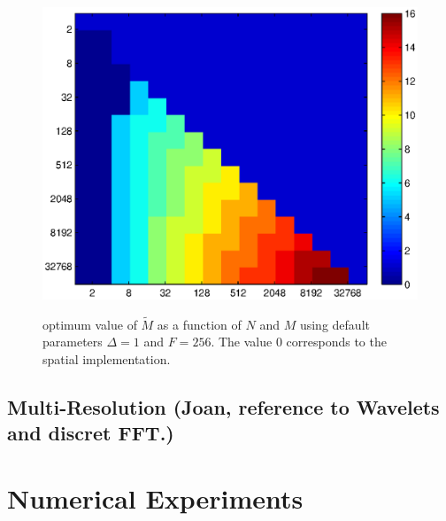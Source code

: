 \documentclass{article}
\begin{document}
\begin{figure}[h]
\caption{optimum value of $\tilde{M}$ as a function of $N$ and $M$ 
using default parameters $\Delta=1$ and $F=256$. The value $0$ 
corresponds to the spatial implementation.} 
\includegraphics[scale=0.6]{img/fftconvanalysis2.eps}
\label{fftfig}
\end{figure}

\subsection{Multi-Resolution (Joan, reference to Wavelets and discret FFT.)}


\section{Numerical Experiments}
\end{document}
